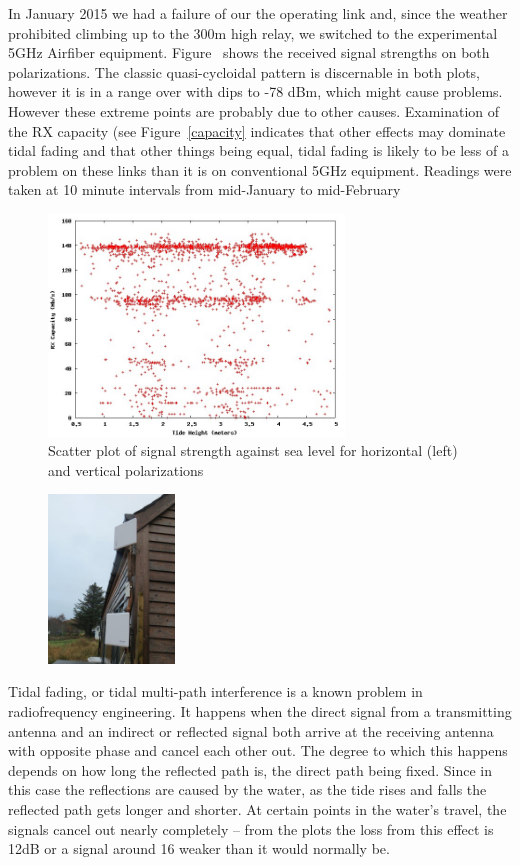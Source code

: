 In January 2015 we had a failure of our the operating link and, since
the weather prohibited climbing up to the 300m high relay, we switched
to the experimental 5GHz Airfiber equipment.
Figure~\label{fig:rxpower} shows the received signal strengths on both
polarizations.  The classic quasi-cycloidal pattern is discernable in
both plots, however it is in a range over with dips to -78 dBm, which
might cause problems.  However these extreme points are probably due
to other causes. Examination of the RX capacity (see
Figure~\ref{capacity} indicates that other effects may dominate tidal
fading and that other things being equal, tidal fading is likely to be
less of a problem on these links than it is on conventional 5GHz
equipment. Readings were taken at 10 minute intervals from mid-January
to mid-February
\begin{figure}
\includegraphics[width=0.7\textwidth]{tidedata/rxcapacity.jpg}
\caption{Scatter plot of signal strength against sea level for
  horizontal (left) and vertical  polarizations}
\label{fig:capacity}
\end{figure}

\begin{figure}
  \includegraphics[width=0.3\textwidth]{tommy-diversity}
\end{figure}
Tidal fading, or tidal multi-path interference is a known problem in
radiofrequency engineering. It happens when the direct signal from
a transmitting antenna and an indirect or reflected signal both arrive at
the receiving antenna with opposite phase and cancel each other
out. The degree to which this happens depends on how long the
reflected path is, the direct path being fixed. Since in this case the
reflections are caused by the water, as the tide rises and falls the
reflected path gets longer and shorter. At certain points in the
water's travel, the signals cancel out nearly completely -- from the
plots the loss from this effect is 12dB or a signal around 16 weaker
than it would normally be.

